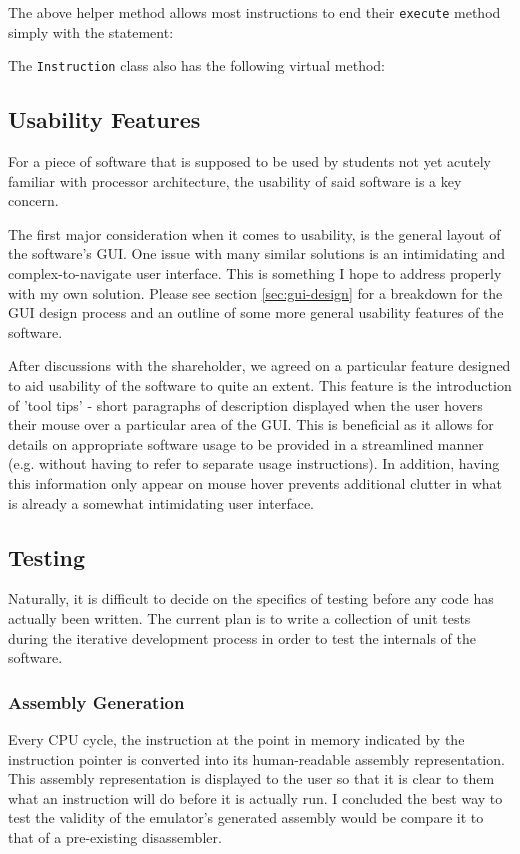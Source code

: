     The above helper method allows most instructions to end their \texttt{execute} method simply with the statement: 

    The \texttt{Instruction} class also has the following virtual method: 

\subsection{Usability Features}
    For a piece of software that is supposed to be used by students not yet acutely familiar with processor architecture, the usability of said software is a key concern.

    The first major consideration when it comes to usability, is the general layout of the software's GUI. One issue with many similar solutions is an intimidating and complex-to-navigate user interface. This is something I hope to address properly with my own solution. Please see section \ref{sec:gui-design} for a breakdown for the GUI design process and an outline of some more general usability features of the software.

    After discussions with the shareholder, we agreed on a particular feature designed to aid usability of the software to quite an extent. This feature is the introduction of 'tool tips' - short paragraphs of description displayed when the user hovers their mouse over a particular area of the GUI. This is beneficial as it allows for details on appropriate software usage to be provided in a streamlined manner (e.g. without having to refer to separate usage instructions). In addition, having this information only appear on mouse hover prevents additional clutter in what is already a somewhat intimidating user interface.

\subsection{Testing}
    Naturally, it is difficult to decide on the specifics of testing before any code has actually been written. The current plan is to write a collection of unit tests during the iterative development process in order to test the internals of the software.

    \subsubsection{Assembly Generation}
        Every CPU cycle, the instruction at the point in memory indicated by the instruction pointer is converted into its human-readable assembly representation. This assembly representation is displayed to the user so that it is clear to them what an instruction will do before it is actually run. I concluded the best way to test the validity of the emulator's generated assembly would be compare it to that of a pre-existing disassembler.

